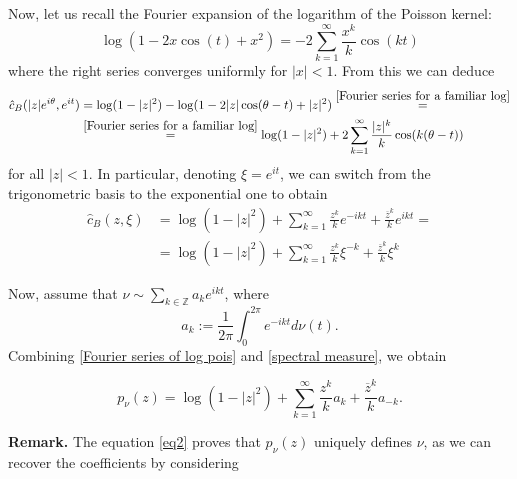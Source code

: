 \documentclass[11pt]{article}
\begin{document}
Now, let us recall the Fourier expansion of the logarithm of the Poisson kernel:
\begin{equation}
	\label{Fourier series for a familiar log}
	\log(1 - 2x \cos(t) + x^2) = -2 \sum_{k=1}^{\infty} \frac{x^k}{k} \cos(k t)
\end{equation}
where the right series converges uniformly for $|x| < 1$. From this we can deduce
\[
\begin{aligned}
	\hat{c}_B(|z|e^{i \theta}, e^{i t}) &= \log(1 - |z|^2) - \log(1 - 2|z| \cos(\theta - t) + |z|^2) \stackrel{\eqref{Fourier series for a familiar log}}{=} \\ 
								&\stackrel{\eqref{Fourier series for a familiar log}}{=} \log(1 - |z|^2) + 2 \sum_{k=1}^\infty \frac{|z|^k}{k} \cos(k(\theta - t))
\end{aligned}
\]
for all $|z| < 1$. In particular, denoting $\xi = e^{it}$, we can switch from the trigonometric basis to the exponential one to obtain
\begin{equation}
	\label{Fourier series of log pois}
	\begin{aligned}
		\hat{c}_B(z, \xi) &= \log(1 - |z|^2) + \sum_{k=1}^\infty \frac{z^k}{k} e^{-i k t} + \frac{\overline{z}^k}{k} e^{i k t} = \\ 
		&= \log(1 - |z|^2) + \sum_{k=1}^\infty \frac{z^k}{k} \xi^{-k} + \frac{\overline{z}^k}{k} \xi^k
	\end{aligned}
\end{equation}

Now, assume that $\nu \sim \sum_{k \in \mathbb{Z}} a_k e^{i k t}$, where
\begin{equation}
	\label{spectral measure}
	a_k := \frac{1}{2\pi} \int_0^{2 \pi} e^{- i k t} d\nu(t).
\end{equation} 
Combining \eqref{Fourier series of log pois} and \eqref{spectral measure}, we obtain

\begin{equation}
	\label{eq2}
	p_\nu(z) = \log(1 - |z|^2) + \sum_{k=1}^\infty \frac{z^k}{k} a_k + \frac{\overline{z}^k}{k} a_{-k}.
\end{equation}

\textbf{Remark.} The equation \eqref{eq2} proves that $p_\nu(z)$ uniquely defines $\nu$, as we can recover the coefficients by considering
\end{document}
